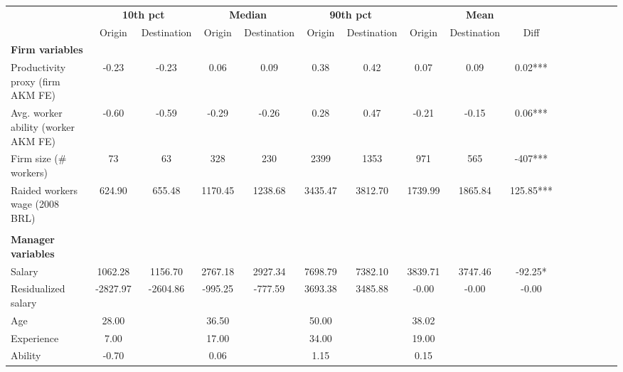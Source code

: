 {
\def\sym#1{\ifmmode^{#1}\else\(^{#1}\)\fi}
\begin{tabular}{l*{5}{ccc}}
\toprule
                    &\multicolumn{2}{c}{\textbf{10th pct}}&\multicolumn{2}{c}{\textbf{Median}}&\multicolumn{2}{c}{\textbf{90th pct}}&\multicolumn{3}{c}{\textbf{Mean}}        \\\cmidrule(lr){2-3}\cmidrule(lr){4-5}\cmidrule(lr){6-7}\cmidrule(lr){8-10}
                    &      Origin& Destination&      Origin& Destination&      Origin& Destination&      Origin& Destination&        Diff   \\
\midrule
\textbf{Firm variables}&            &            &            &            &            &            &            &            &               \\
Productivity proxy (firm AKM FE)&       -0.23&       -0.23&        0.06&        0.09&        0.38&        0.42&        0.07&        0.09&        0.02***\\
Avg. worker ability (worker AKM FE)&       -0.60&       -0.59&       -0.29&       -0.26&        0.28&        0.47&       -0.21&       -0.15&        0.06***\\
Firm size (\# workers)&          73&          63&         328&         230&        2399&        1353&         971&         565&        -407***\\
Raided workers wage (2008 BRL)&      624.90&      655.48&     1170.45&     1238.68&     3435.47&     3812.70&     1739.99&     1865.84&      125.85***\\
\\ \textbf{Manager variables}&            &            &            &            &            &            &            &            &               \\
Salary              &     1062.28&     1156.70&     2767.18&     2927.34&     7698.79&     7382.10&     3839.71&     3747.46&      -92.25*  \\
Residualized salary &    -2827.97&    -2604.86&     -995.25&     -777.59&     3693.38&     3485.88&       -0.00&       -0.00&       -0.00   \\
Age                 &       28.00&            &       36.50&            &       50.00&            &       38.02&            &               \\
Experience          &        7.00&            &       17.00&            &       34.00&            &       19.00&            &               \\
Ability             &       -0.70&            &        0.06&            &        1.15&            &        0.15&            &               \\

\end{tabular}}
